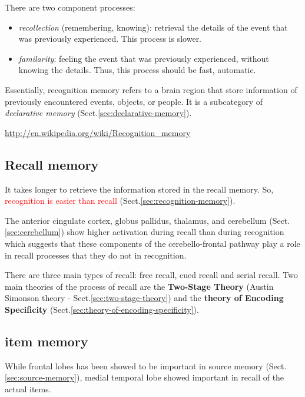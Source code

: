 There are two component processes:
\begin{itemize}
  \item {\it recollection} (remembering, knowing): retrieval the details of the
  event that was previously experienced. This process is slower.
  
  \item {\it familarity}: feeling the event that was previously experienced,
  without knowing the details. Thus, this process should be fast, automatic.
\end{itemize}

Essentially, recognition memory refers to a brain region that store information
of previously encountered events, objects, or people. It is a subcategory of
{\it declarative memory} (Sect.\ref{sec:declarative-memory}).


\url{http://en.wikipedia.org/wiki/Recognition_memory}

\subsection{Recall memory}
\label{sec:recall-memory}

It takes longer to retrieve the information stored in the recall memory.
So, \textcolor{red}{recognition is easier than recall}
(Sect.\ref{sec:recognition-memory}).

The anterior cingulate cortex, globus pallidus, thalamus, and cerebellum
(Sect.\ref{sec:cerebellum}) show higher activation during recall than during
recognition which suggests that these components of the cerebello-frontal
pathway play a role in recall processes that they do not in recognition.

There are three main types of recall: free recall, cued recall and serial
recall. Two main theories of the process of recall are the {\bf Two-Stage
Theory} (Austin Simonson theory - Sect.\ref{sec:two-stage-theory}) and the {\bf theory of
Encoding Specificity} (Sect.\ref{sec:theory-of-encoding-specificity}).

\subsection{item memory}
\label{sec:item-memory}

While frontal lobes has been showed to be important in source memory
(Sect.\ref{sec:source-memory}), medial temporal lobe showed important in
recall of the actual items.

